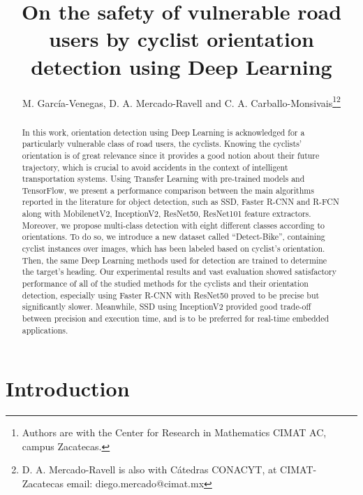 \documentclass[journal]{IEEEtran}
\begin{document}
\title{On the safety of vulnerable road users by cyclist orientation detection using Deep Learning}

\author{{M. García-Venegas}, {D. A. Mercado-Ravell } and {C. A. Carballo-Monsivais}\thanks{{Authors are with the Center for Research in Mathematics CIMAT AC, campus Zacatecas.}}\thanks{{D. A. Mercado-Ravell is also with Cátedras CONACYT, at CIMAT-Zacatecas}
email: {diego.mercado@cimat.mx}}}

\maketitle 

\begin{abstract}
In this work, orientation detection using Deep Learning is acknowledged for a particularly vulnerable class of road users, the cyclists.  Knowing the cyclists' orientation is of great relevance since it provides a good notion about their future trajectory, which is crucial to avoid accidents in the context of intelligent transportation systems. Using Transfer Learning with pre-trained models and TensorFlow, we present a performance comparison between the main algorithms reported in the literature for object detection, such as SSD, Faster R-CNN and R-FCN along with MobilenetV2, InceptionV2, ResNet50, ResNet101 feature extractors. Moreover, we propose multi-class detection with eight different classes according to orientations. To do so, we introduce a new dataset called ``Detect-Bike'', containing  cyclist instances over  images, which has been labeled based on cyclist's orientation. Then, the same Deep Learning methods used for detection are trained to determine the target's heading. Our experimental results and vast evaluation showed satisfactory performance of all of the studied methods for the cyclists and their orientation detection, especially using Faster R-CNN with ResNet50 proved to be precise but significantly slower. Meanwhile, SSD using InceptionV2 provided good trade-off between precision and execution time, and is to be preferred for real-time embedded applications.
\end{abstract}

\section{Introduction}
\label{sec:Introduction}
\end{document}
